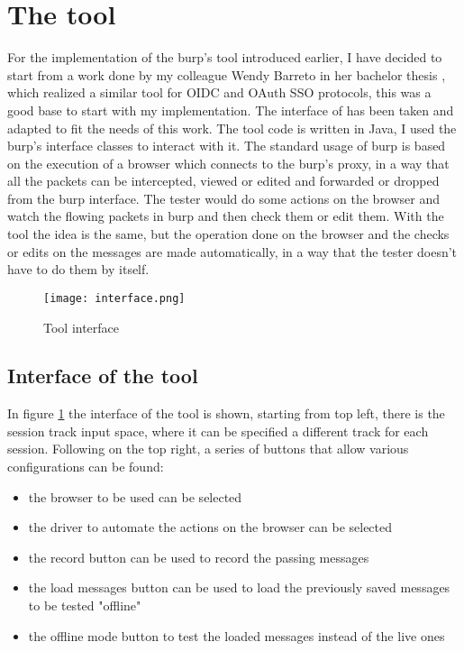 \section{The tool}
For the implementation of the \Gls{burp}'s tool introduced earlier, I have decided to start from a work done by my colleague Wendy Barreto in her bachelor thesis \cite{wendy_barreto}, which realized a similar tool for \Gls{OIDC} and \Gls{OAuth} SSO protocols, this was a good base to start with my implementation. The interface of \cite{wendy_barreto} has been taken and adapted to fit the needs of this work. The tool code is written in Java, I used the \Gls{burp}'s interface classes to interact with it.
The standard usage of \Gls{burp} is based on the execution of a browser which connects to the \Gls{burp}'s proxy, in a way that all the packets can be intercepted, viewed or edited and forwarded or dropped from the \Gls{burp} interface. The tester would do some actions on the browser and watch the flowing packets in \Gls{burp} and then check them or edit them. With the tool the idea is the same, but the operation done on the browser and the checks or edits on the messages are made automatically, in a way that the tester doesn't have to do them by itself.

\begin{figure}
    \texttt{[image: interface.png]}
    \caption{Tool interface}
    \label{fig:plugin_interface}
\end{figure}

\subsection{Interface of the tool}
In figure \ref{fig:plugin_interface} the interface of the tool is shown, starting from top left, there is the session track input space, where it can be specified a different track for each session. Following on the top right, a series of buttons that allow various configurations can be found:
\begin{itemize}
    \item the browser to be used can be selected
    \item the driver to automate the actions on the browser can be selected
    \item the record button can be used to record the passing messages
    \item the load messages button can be used to load the previously saved messages to be tested "offline"
    \item the offline mode button to test the loaded messages instead of the live ones
\end{itemize}

